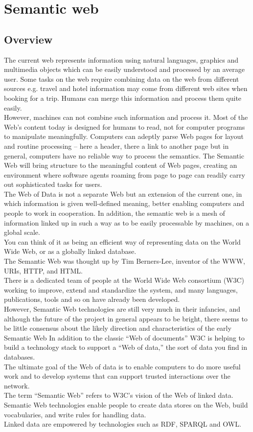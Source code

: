 \documentclass[a4paper,12pt,oneside]{report}
\begin{document}
{\section{Semantic web}
\label{sec:sem}
\subsection{Overview}
{       The current web represents information using natural languages, graphics and multimedia objects which can be easily understood and processed by an average user. Some tasks on the web require combining data on the web from different sources e.g. travel and hotel information may come from different web sites when booking for a trip. Humans can merge this information and process them quite easily.\\
 However, machines can not combine such information and process it. Most of the Web’s content today is designed for humans to read, not for computer programs to manipulate meaningfully. Computers can adeptly parse Web pages for layout and routine processing – here a header, there a link to another page but in general, computers have no reliable way to process the semantics.
The Semantic Web will bring structure to the meaningful content of Web pages, creating an environment where software agents roaming from page to page can readily carry out sophisticated tasks for users.\\
The  Web of Data is not a separate Web but an extension of the current one, in which information is given well-defined meaning, better enabling computers and people to work in cooperation.
In addition, the semantic web  is a mesh of information linked up in such a way as to be easily processable by machines, on a global scale.\\
You can think of it as being an efficient way of representing data on the World Wide Web, or as a globally linked database.\\
The Semantic Web was thought up by Tim Berners-Lee, inventor of the WWW, URIs, HTTP, and HTML.\\
There is a dedicated team of people at the World Wide Web consortium (W3C) working to improve, extend and standardize the system, and many languages, publications, tools and so on have already been developed. \\
However, Semantic Web technologies are still very much in their infancies, and although the future of the project in general appears to be bright, there seems to be little consensus about the likely direction and characteristics of the early Semantic Web
      In addition to the classic “Web of documents” W3C is helping to build a technology stack to support a “Web of data,” the sort of data you find in databases.\\
The ultimate goal of the Web of data is to enable computers to do more useful work and to develop systems that can support trusted interactions over the network.\\
 The term “Semantic Web” refers to W3C’s vision of the Web of linked data. Semantic Web technologies enable people to create data stores on the Web, build vocabularies, and write rules for handling data.\\
Linked data are empowered by technologies such as RDF, SPARQL and OWL.}
}
\end{document}
